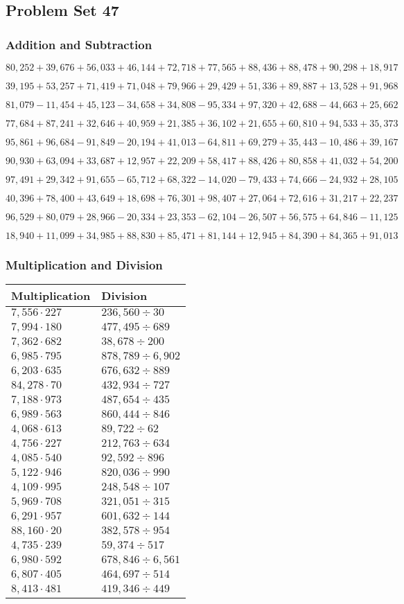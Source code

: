 \hypertarget{problem-set-47-3}{%
\subsection{Problem Set 47}\label{problem-set-47-3}}

\hypertarget{addition-and-subtraction-269}{%
\subsubsection{Addition and
Subtraction}\label{addition-and-subtraction-269}}

\(80,252+39,676+56,033+46,144+72,718+77,565+88,436+88,478+90,298+ 18,917\)

\(39,195+53,257+71,419+71,048+79,966+29,429+51,336+89,887+13,528+91,968\)

\(81,079-11,454+45,123-34,658+34,808-95,334+97,320+42,688-44,663+25,662\)

\(77,684+87,241+32,646+40,959+21,385+36,102+21,655+60,810+94,533+35,373\)

\(95,861+96,684-91,849-20,194+41,013-64,811+69,279+35,443-10,486+39,167\)

\(90,930+63,094+33,687+12,957+22,209+58,417+88,426+80,858+41,032+54,200\)

\(97,491+29,342+91,655-65,712+68,322-14,020-79,433+74,666-24,932+28,105\)

\(40,396+78,400+43,649+18,698+76,301+98,407+27,064+72,616+31,217+22,237\)

\(96,529+80,079+28,966-20,334+23,353-62,104-26,507+56,575+64,846-11,125\)

\(18,940+11,099+34,985+88,830+85,471+81,144+12,945+84,390+84,365+91,013\)

\hypertarget{multiplication-and-division-268}{%
\subsubsection{Multiplication and
Division}\label{multiplication-and-division-268}}

\begin{longtable}[]{@{}ll@{}}
\toprule
Multiplication & Division\tabularnewline
\midrule
\endhead
\(7,556\cdot227\) & \(236,560 ÷30\)\tabularnewline
\(7,994\cdot180\) & \(477,495÷689\)\tabularnewline
\(7,362\cdot682\) & \(38,678÷200\)\tabularnewline
\(6,985\cdot795\) & \(878,789÷6,902\)\tabularnewline
\(6,203\cdot635\) & \(676,632÷889\)\tabularnewline
\(84,278\cdot70\) & \(432,934÷727\)\tabularnewline
\(7,188\cdot973\) & \(487,654÷435\)\tabularnewline
\(6,989\cdot563\) & \(860,444÷846\)\tabularnewline
\(4,068\cdot613\) & \(89,722÷62\)\tabularnewline
\(4,756\cdot227\) & \(212,763÷634\)\tabularnewline
\(4,085\cdot540\) & \(92,592÷896\)\tabularnewline
\(5,122\cdot946\) & \(820,036÷990\)\tabularnewline
\(4,109\cdot995\) & \(248,548÷107\)\tabularnewline
\(5,969\cdot708\) & \(321,051÷315\)\tabularnewline
\(6,291\cdot957\) & \(601,632÷144\)\tabularnewline
\(88,160\cdot20\) & \(382,578÷954\)\tabularnewline
\(4,735\cdot239\) & \(59,374÷517\)\tabularnewline
\(6,980\cdot592\) & \(678,846÷6,561\)\tabularnewline
\(6,807\cdot405\) & \(464,697÷514\)\tabularnewline
\(8,413\cdot481\) & \(419,346÷449\)\tabularnewline
\bottomrule
\end{longtable}

